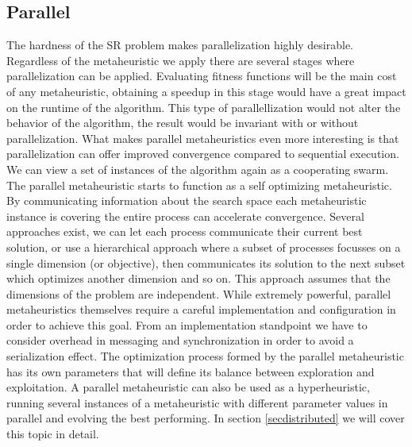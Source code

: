 \subsection{Parallel}
The hardness of the SR problem makes parallelization highly desirable. Regardless of the metaheuristic we apply there are several stages where parallelization can be applied. Evaluating fitness functions will be the main cost of any metaheuristic, obtaining a speedup in this stage would have a great impact on the runtime of the algorithm. This type of parallellization would not alter the behavior of the algorithm, the result would be invariant with or without parallelization. What makes parallel metaheuristics even more interesting is that parallelization can offer improved convergence compared to sequential execution. We can view a set of instances of the algorithm again as a cooperating swarm. The parallel metaheuristic starts to function as a self optimizing metaheuristic. By communicating information about the search space each metaheuristic instance is covering the entire process can accelerate convergence. 
Several approaches exist, we can let each process communicate their current best solution, or use a hierarchical approach where a subset of processes focusses on a single dimension (or objective), then communicates its solution to the next subset which optimizes another dimension and so on. This approach assumes that the dimensions of the problem are independent.
While extremely powerful, parallel metaheuristics themselves require a careful implementation and configuration in order to achieve this goal. From an implementation standpoint we have to consider overhead in messaging and synchronization in order to avoid a serialization effect. The optimization process formed by the parallel metaheuristic has its own parameters that will define its balance between exploration and exploitation. A parallel metaheuristic can also be used as a hyperheuristic, running several instances of a metaheuristic with different parameter values in parallel and evolving the best performing. In section \ref{secdistributed} we will cover this topic in detail.